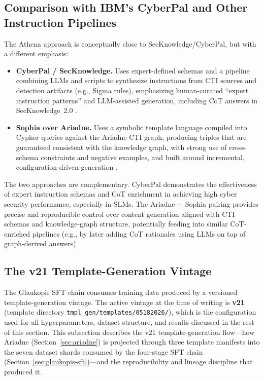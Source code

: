 \documentclass[unnumsec,webpdf,contemporary,large]{oup-authoring-template}
\theoremstyle{thmstyleone}
\theoremstyle{thmstyletwo}
\theoremstyle{thmstylethree}
\begin{document}
\subsection{Comparison with IBM's CyberPal and Other Instruction Pipelines}
\label{sec:glaukopis-vs-cyberpal}

The Athena approach is conceptually close to SecKnowledge/CyberPal, but with a different emphasis:

\begin{itemize}
  \item \textbf{CyberPal / SecKnowledge.} Uses expert-defined schemas and a pipeline combining LLMs and scripts to synthesize instructions from CTI sources and detection artifacts (e.g., Sigma rules), emphasizing human-curated ``expert instruction patterns'' and LLM-assisted generation, including CoT answers in SecKnowledge~2.0 \cite{levi2024cyberpal,levi2025toward}.
  \item \textbf{Sophia over Ariadne.} Uses a symbolic template language compiled into Cypher queries against the Ariadne CTI graph, producing triples that are guaranteed consistent with the knowledge graph, with strong use of cross-schema constraints and negative examples, and built around incremental, configuration-driven generation \cite{cardei2025ift}.
\end{itemize}

The two approaches are complementary. CyberPal demonstrates the effectiveness of expert instruction schemas and CoT enrichment in achieving high cyber security performance, especially in SLMs. The Ariadne + Sophia pairing provides precise and reproducible control over content generation aligned with CTI schemas and knowledge-graph structure, potentially feeding into similar CoT-enriched pipelines (e.g., by later adding CoT rationales using LLMs on top of graph-derived answers).

\subsection{The v21 Template-Generation Vintage}
\label{sec:glaukopis-v21-templates}

The Glaukopis SFT chain consumes training data produced by a versioned template-generation vintage. The active vintage at the time of writing is \textbf{v21} (template directory \texttt{tmpl\_gen/templates/05182026/}), which is the configuration used for all hyperparameters, dataset structure, and results discussed in the rest of this section. This subsection describes the v21 template-generation flow---how Ariadne (Section~\ref{sec:ariadne}) is projected through three template manifests into the seven dataset shards consumed by the four-stage SFT chain (Section~\ref{sec:glaukopis-sft})---and the reproducibility and lineage discipline that produced it.
\end{document}
